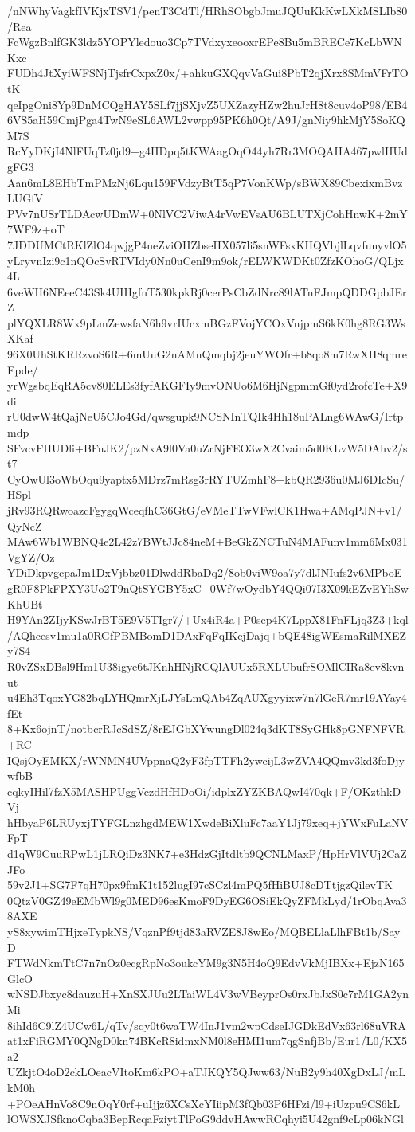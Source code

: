 /nNWhyVagkfIVKjxTSV1/penT3CdTl/HRhSObgbJmuJQUuKkKwLXkMSLIb80/Rea
FcWgzBnlfGK3ldz5YOPYledouo3Cp7TVdxyxeooxrEPe8Bu5mBRECe7KcLbWNKxc
FUDh4JtXyiWFSNjTjsfrCxpxZ0x/+ahkuGXQqvVaGui8PbT2qjXrx8SMmVFrTOtK
qeIpgOni8Yp9DnMCQgHAY5SLf7jjSXjvZ5UXZazyHZw2huJrH8t8cuv4oP98/EB4
6VS5aH59CmjPga4TwN9eSL6AWL2vwpp95PK6h0Qt/A9J/gnNiy9hkMjY5SoKQM7S
RcYyDKjI4NlFUqTz0jd9+g4HDpq5tKWAagOqO44yh7Rr3MOQAHA467pwlHUdgFG3
Aan6mL8EHbTmPMzNj6Lqu159FVdzyBtT5qP7VonKWp/sBWX89CbexixmBvzLUGfV
PVv7nUSrTLDAcwUDmW+0NlVC2ViwA4rVwEVsAU6BLUTXjCohHnwK+2mY7WF9z+oT
7JDDUMCtRKlZlO4qwjgP4neZviOHZbseHX057li5snWFsxKHQVbjlLqvfunyvlO5
yLryvnIzi9c1nQOcSvRTVIdy0Nn0uCenI9m9ok/rELWKWDKt0ZfzKOhoG/QLjx4L
6veWH6NEeeC43Sk4UIHgfnT530kpkRj0cerPsCbZdNrc89lATnFJmpQDDGpbJErZ
plYQXLR8Wx9pLmZewsfaN6h9vrIUcxmBGzFVojYCOxVnjpmS6kK0hg8RG3WsXKaf
96X0UhStKRRzvoS6R+6mUuG2nAMnQmqbj2jeuYWOfr+b8qo8m7RwXH8qmreEpde/
yrWgsbqEqRA5cv80ELEs3fyfAKGFIy9mvONUo6M6HjNgpmmGf0yd2rofcTe+X9di
rU0dwW4tQajNeU5CJo4Gd/qwsgupk9NCSNInTQIk4Hh18uPALng6WAwG/Irtpmdp
SFvcvFHUDli+BFnJK2/pzNxA9l0Va0uZrNjFEO3wX2Cvaim5d0KLvW5DAhv2/st7
CyOwUl3oWbOqu9yaptx5MDrz7mRsg3rRYTUZmhF8+kbQR2936u0MJ6DIcSu/HSpl
jRv93RQRwoazcFgygqWceqfhC36GtG/eVMeTTwVFwlCK1Hwa+AMqPJN+v1/QyNcZ
MAw6Wb1WBNQ4e2L42z7BWtJJc84neM+BeGkZNCTuN4MAFunv1mm6Mx031VgYZ/Oz
YDiDkpvgcpaJm1DxVjbbz01DlwddRbaDq2/8ob0viW9oa7y7dlJNIufs2v6MPboE
gR0F8PkFPXY3Uo2T9nQtSYGBY5xC+0Wf7wOydbY4QQi07I3X09kEZvEYhSwKhUBt
H9YAn2ZIjyKSwJrBT5E9V5TIgr7/+Ux4iR4a+P0sep4K7LppX81FnFLjq3Z3+kql
/AQhcesv1mu1a0RGfPBMBomD1DAxFqFqIKcjDajq+bQE48igWEsmaRilMXEZy7S4
R0vZSxDBsl9Hm1U38igye6tJKnhHNjRCQlAUUx5RXLUbufrSOMlCIRa8ev8kvnut
u4Eh3TqoxYG82bqLYHQmrXjLJYsLmQAb4ZqAUXgyyixw7n7lGeR7mr19AYay4fEt
8+Kx6ojnT/notbcrRJcSdSZ/8rEJGbXYwungDl024q3dKT8SyGHk8pGNFNFVR+RC
IQsjOyEMKX/rWNMN4UVppnaQ2yF3fpTTFh2ywcijL3wZVA4QQmv3kd3foDjywfbB
cqkyIHil7fzX5MASHPUggVczdHfHDoOi/idplxZYZKBAQwI470qk+F/OKzthkDVj
hHbyaP6LRUyxjTYFGLnzhgdMEW1XwdeBiXluFc7aaY1Jj79xeq+jYWxFuLaNVFpT
d1qW9CuuRPwL1jLRQiDz3NK7+e3HdzGjItdltb9QCNLMaxP/HpHrVlVUj2CaZJFo
59v2J1+SG7F7qH70px9fmK1t152lugI97cSCzl4mPQ5fHiBUJ8cDTtjgzQilevTK
0QtzV0GZ49eEMbWl9g0MED96esKmoF9DyEG6OSiEkQyZFMkLyd/1rObqAva38AXE
yS8xywimTHjxeTypkNS/VqznPf9tjd83aRVZE8J8wEo/MQBELlaLlhFBt1b/SayD
FTWdNkmTtC7n7nOz0ecgRpNo3oukcYM9g3N5H4oQ9EdvVkMjIBXx+EjzN165GlcO
wNSDJbxyc8dauzuH+XnSXJUu2LTaiWL4V3wVBeyprOs0rxJbJxS0c7rM1GA2ynMi
8ihId6C9lZ4UCw6L/qTv/sqy0t6waTW4InJ1vm2wpCdseIJGDkEdVx63rl68uVRA
at1xFiRGMY0QNgD0kn74BKcR8idmxNM0l8eHMI1um7qgSnfjBb/Eur1/L0/KX5a2
UZkjtO4oD2ckLOeacVItoKm6kPO+aTJKQY5QJww63/NuB2y9h40XgDxLJ/mLkM0h
+POeAHnVo8C9nOqY0rf+uIjjz6XCsXcYIiipM3fQb03P6HFzi/l9+iUzpu9CS6kL
lOWSXJSfknoCqba3BepRcqaFziytTlPoG9ddvHAwwRCqhyi5U42gnf9cLp06kNGl
